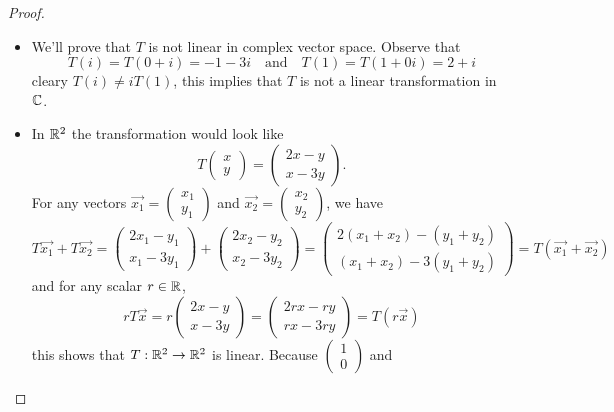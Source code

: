 \documentclass{article}
\begin{document}
\begin{proof}
\begin{enumerate}
      \begin{itemize}
        \item We'll prove that $T$ is not linear in complex vector space.
          Observe that
          \[
            T(i)=T(0+i)=-1-3i
            \quad\text{and}\quad
            T(1)=T(1+0i)=2+i
          \]
          cleary $T(i)\neq iT(1)$, this implies that $T$ is 
          not a linear transformation in $\C$.
        \item 
          In $\R^2$ the transformation would look like
          \[
            T\begin{pmatrix}x\\y\end{pmatrix}=
            \begin{pmatrix}2x-y\\x-3y\end{pmatrix}.
          \]
          For any vectors
          $\vec{x_1}=\begin{pmatrix}x_1\\y_1\end{pmatrix}$ and
          $\vec{x_2}=\begin{pmatrix}x_2\\y_2\end{pmatrix}$, we have
          \[
            T\vec{x_1}+T\vec{x_2}=
            \begin{pmatrix}2x_1-y_1\\x_1-3y_1\end{pmatrix}+
            \begin{pmatrix}2x_2-y_2\\x_2-3y_2\end{pmatrix}=
            \begin{pmatrix}2(x_1+x_2)-(y_1+y_2)\\(x_1+x_2)-3(y_1+y_2)\end{pmatrix}=
            T(\vec{x_1}+\vec{x_2})
          \]
          and for any scalar $r\in\R$,
          \[
            rT\vec{x}=r\begin{pmatrix}2x-y\\x-3y\end{pmatrix}=
            \begin{pmatrix}2rx-ry\\rx-3ry\end{pmatrix}=
            T(r\vec{x})
          \]
          this shows that $T:\R^2\to\R^2$ is linear.
          Because $\begin{pmatrix} 1\\0 \end{pmatrix}$ and 

\end{itemize}
\end{enumerate}
\end{proof}
\end{document}
